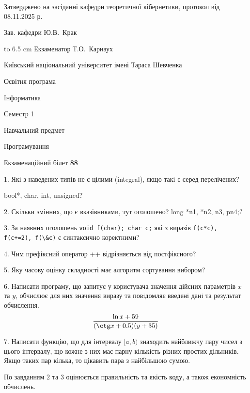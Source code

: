 \documentclass[12pt, ukrainian]{article}
\def\code#1{\Verb!#1!}
\begin{document}
{\smallskip\smallskip \begin {scriptsize} Затверджено на засіданні кафедри теоретичної кібернетики, протокол   від   08.11.2025 р.\par\smallskip\smallskip\smallskip\smallskip
{\parbox {6.5 cm} {Зав. кафедри \dotfill Ю.В.~Крак}}\hspace {0.7cm} {\hbox to 6.5 cm { Екзаменатор \dotfill Т.О.~Карнаух}} \end{scriptsize}}
\vspace{0.9cm}
{{\begin {scriptsize}\par
{ \center  Київський національний університет імені Тараса Шевченка \par}
{\parbox {5 cm}{Освітня програма \hfill}{\parbox {7 cm}{Інформатика\hfill}}\parbox {6 cm}{\hfill Семестр 1}}\par
{\parbox {5 cm} {Навчальний предмет \hfill}\parbox {7 cm}{Програмування \hfill}\parbox {6cm}{\hfill}\par}\vspace{-15pt} \end{scriptsize}}{\center Екзаменаційний білет \No \textbf { 88 }\par}}
{%
1. Які з наведених типів не є цілими (integral), якщо такі є серед перелічених?

bool*, char, int, unsigned?
\par
\vspace{2mm}
2. Скільки змінних, що є вказівниками, тут оголошено?
long *n1, *n2, n3, pn4;?
\par
\vspace{2mm}
3. За наявних оголошень \code{void f(char); char c;} які з виразів \code{f(c*c), f(c+=2), f(\&c)} є синтаксично коректними?
\par
\vspace{2mm}
4. Чим префіксний оператор ++ відрізняється від постфіксного?
\par
\vspace{2mm}
5. Яку часову оцінку складності має алгоритм сортування вибором?
\par
\vspace{2mm}
6. Написати програму, що запитує у користувача значення дійсних параметрів $x$ та $y$, обчислює для них значення виразу та повiдомляє введенi данi та результат обчислення.
$$\frac{\ln x + 59}{(\ctg x + 0.5) (y + 35)}$$ 

\par
7. Написати функцію, що для інтервалу $[a, b)$ знаходить найближчу пару чисел з цього інтервалу, що кожне з них має парну кількість різних простих дільників. Якщо таких пар кілька, то цікавить пара з найбільшою сумою.

По завданням 2 та 3 оцінюється правильність та якість коду, а також економність обчислень.

}
\end{document}
